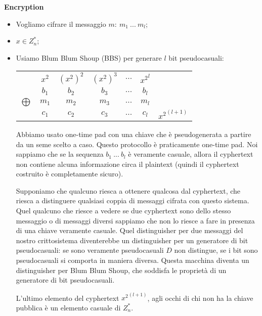 \noindent \textbf{Encryption}
\begin{itemize}
    \item Vogliamo cifrare il messaggio $m: \ m_1 \ ... \ m_l$;
    \item $x \in Z_n^*$;
    \item Usiamo Blum Blum Shoup (BBS) per generare $l$ bit pseudocasuali:
    \begin{center}
            \begin{tabular}{ c c c c c c c }
              & $x^2$ & ${(x^2)}^2$ & ${(x^2)}^3$ & $...$ & ${x^2}^{l}$ & \\
              & $b_1$ & $b_2$ & $b_3$ & $...$ & $b_l$ & \\
              $\bigoplus$ & $m_1$ & $m_2$ & $m_3$ & $...$ & $m_l$ & \\
              \hline
              & $c_1$ & $c_2$ & $c_3$ & $...$ & $c_l$ & ${x^2}^{(l+1)}$ \\
            \end{tabular}
        \end{center}

        \noindent Abbiamo usato one-time pad con una chiave che è pseudogenerata a partire da un seme scelto a caso. Questo protocollo è praticamente one-time pad. Noi sappiamo che se la sequenza $b_1 \ ... \ b_l$ è veramente casuale, allora il cyphertext non contiene alcuna informazione circa il plaintext (quindi il cyphertext costruito è completamente sicuro).

        Supponiamo che qualcuno riesca a ottenere qualcosa dal cyphertext, che riesca a distinguere qualsiasi coppia di messaggi cifrata con questo sistema. Quel qualcuno che riesce a vedere se due cyphertext sono dello stesso messaggio o di messaggi diversi sappiamo che non lo riesce a fare in presenza di una chiave veramente casuale. Quel distinguisher per due messaggi del nostro crittosistema diventerebbe un distinguisher per un generatore di bit pseudocasuali: se sono veramente pseudocasuali $D$ non distingue, se i bit sono pseudocasuali si comporta in maniera diversa. Questa macchina diventa un distinguisher per Blum Blum Shoup, che soddisfa le proprietà di un generatore di bit pseudocasuali.

        L'ultimo elemento del cyphertext ${x^2}^{(l+1)}$, agli occhi di chi non ha la chiave pubblica è un elemento casuale di $Z_n^*$. 
\end{itemize}

